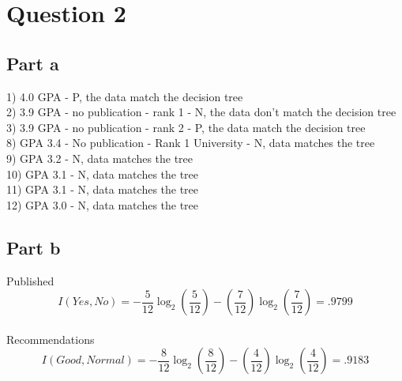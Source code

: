 \documentclass[12pt]{article}
\begin{document}
\section*{Question 2}

\subsection*{Part a}

1) 4.0 GPA - P, the data match the decision tree\\
2) 3.9 GPA - no publication - rank 1 - N, the data don't match the decision tree\\
3) 3.9 GPA - no publication - rank 2 - P, the data match the decision tree\\

8) GPA 3.4 - No publication - Rank 1 University - N, data matches the tree\\
9) GPA 3.2 - N, data matches the tree\\
10) GPA 3.1 - N, data matches the tree\\
11) GPA 3.1 - N, data matches the tree\\
12) GPA 3.0 - N, data matches the tree\\

\subsection*{Part b}

Published
\begin{equation}
I(Yes,No) = -\frac{5}{12}\log_2(\frac{5}{12})-(\frac{7}{12})\log_2(\frac{7}{12}) = .9799
\end{equation}
\\
Recommendations
\begin{equation}
I(Good, Normal) = -\frac{8}{12}\log_2(\frac{8}{12})-(\frac{4}{12})\log_2(\frac{4}{12}) = .9183 
\end{equation}
\end{document}
